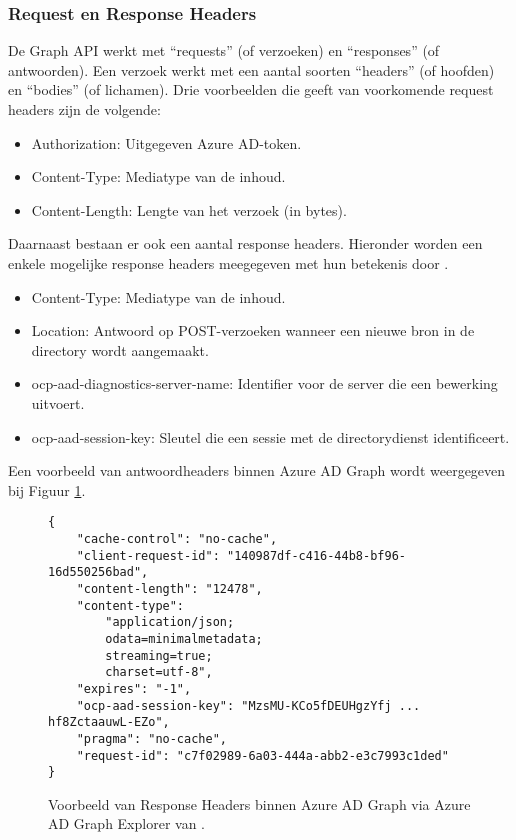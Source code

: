 \subsubsection{Request en Response Headers}


De Graph \ac{API} werkt met “requests” (of verzoeken) en “responses” (of antwoorden). Een verzoek werkt met een aantal soorten “headers” (of hoofden) en “bodies” (of lichamen). Drie voorbeelden die \textcite{Microsoft2015} geeft van voorkomende request headers zijn de volgende:

\begin{itemize}
    \item Authorization: Uitgegeven Azure \ac{AD}-token.
    \item Content-Type: Mediatype van de inhoud.
    \item Content-Length: Lengte van het verzoek (in bytes).
\end{itemize} 

Daarnaast bestaan er ook een aantal response headers. Hieronder worden een enkele mogelijke response headers meegegeven met hun betekenis door \textcite{Microsoft2015}.

\begin{itemize}
    \item Content-Type: Mediatype van de inhoud.
    \item Location: Antwoord op POST-verzoeken wanneer een nieuwe bron in de directory wordt aangemaakt.
    \item ocp-aad-diagnostics-server-name: Identifier voor de server die een bewerking uitvoert.
    \item ocp-aad-session-key: Sleutel die een sessie met de directorydienst identificeert.
\end{itemize}

Een voorbeeld van antwoordheaders binnen Azure \ac{AD} Graph wordt weergegeven bij Figuur \ref{rhaad}. \\

\begin{figure}[h!]
    \scriptsize
    \begin{verbatim} 
{
    "cache-control": "no-cache",
    "client-request-id": "140987df-c416-44b8-bf96-16d550256bad",
    "content-length": "12478",
    "content-type": 
        "application/json; 
        odata=minimalmetadata; 
        streaming=true; 
        charset=utf-8",
    "expires": "-1",
    "ocp-aad-session-key": "MzsMU-KCo5fDEUHgzYfj ... hf8ZctaauwL-EZo",
    "pragma": "no-cache",
    "request-id": "c7f02989-6a03-444a-abb2-e3c7993c1ded"
}
    \end{verbatim}
    \caption[Voorbeeld Response Headers Azure AD Graph]{Voorbeeld van Response Headers binnen Azure \ac{AD} Graph via Azure \Ac{AD} Graph Explorer van \textcite{Microsoft}.}
    \label{rhaad}
\end{figure}





